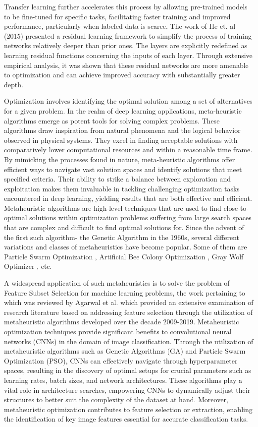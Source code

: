 Transfer learning further accelerates this process by allowing pre-trained models to be fine-tuned for specific tasks, facilitating faster training and improved performance, particularly when labeled data is scarce. The work of He et. al (2015) \cite{8} presented a residual learning framework to simplify the process of training networks relatively deeper than prior ones.  The layers are explicitly redefined as learning residual functions concerning the inputs of each layer. Through extensive empirical analysis, it was shown that these residual networks are more amenable to optimization and can achieve improved accuracy with substantially greater depth.

Optimization involves identifying the optimal solution among a set of alternatives for a given problem. In the realm of deep learning applications, meta-heuristic algorithms emerge as potent tools for solving complex problems. These algorithms draw inspiration from natural phenomena and the logical behavior observed in physical systems. They excel in finding acceptable solutions with comparatively lower computational resources and within a reasonable time frame. By mimicking the processes found in nature, meta-heuristic algorithms offer efficient ways to navigate vast solution spaces and identify solutions that meet specified criteria. Their ability to strike a balance between exploration and exploitation makes them invaluable in tackling challenging optimization tasks encountered in deep learning, yielding results that are both effective and efficient. Metaheuristic algorithms are high-level techniques that are used to find close-to-optimal solutions within optimization problems suffering from large search spaces that are complex and difficult to find optimal solutions for. Since the advent of the first such algorithm- the Genetic Algorithm  \cite{9} in the 1960s, several different variations and classes of metaheuristics have become popular. Some of them are Particle Swarm Optimization  \cite{10}, Artificial Bee Colony Optimization  \cite{11}, Gray Wolf Optimizer  \cite{12}, etc. 

A widespread application of such metaheuristics is to solve the problem of Feature Subset Selection for machine learning problems, the work pertaining to which was reviewed by Agarwal et al.  \cite{13}which provided an extensive examination of research literature based on addressing feature selection through the utilization of metaheuristic algorithms developed over the decade 2009-2019. Metaheuristic optimization techniques provide significant benefits to convolutional neural networks (CNNs) in the domain of image classification. Through the utilization of metaheuristic algorithms such as Genetic Algorithms (GA) and Particle Swarm Optimization (PSO), CNNs can effectively navigate through hyperparameter spaces, resulting in the discovery of optimal setups for crucial parameters such as learning rates, batch sizes, and network architectures. These algorithms play a vital role in architecture searches, empowering CNNs to dynamically adjust their structures to better suit the complexity of the dataset at hand. Moreover, metaheuristic optimization contributes to feature selection or extraction, enabling the identification of key image features essential for accurate classification tasks.

